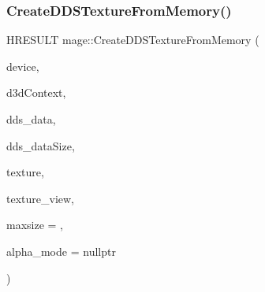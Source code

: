 \subsubsection{\texorpdfstring{Create\+D\+D\+S\+Texture\+From\+Memory()}{CreateDDSTextureFromMemory()}\hspace{0.1cm}{\footnotesize\ttfamily [2/4]}}
{\footnotesize\ttfamily H\+R\+E\+S\+U\+LT mage\+::\+Create\+D\+D\+S\+Texture\+From\+Memory (\begin{DoxyParamCaption}\item[{\+\_\+\+In\+\_\+ \hyperlink{namespacemage_ae74f374780900893caa5555d1031fd79}{Com\+Ptr}$<$ I\+D3\+D11\+Device2 $>$}]{device,  }\item[{\+\_\+\+In\+\_\+opt\+\_\+ I\+D3\+D11\+Device\+Context $\ast$}]{d3d\+Context,  }\item[{\+\_\+\+In\+\_\+reads\+\_\+bytes\+\_\+(dds\+\_\+data\+Size) const uint8\+\_\+t $\ast$}]{dds\+\_\+data,  }\item[{\+\_\+\+In\+\_\+ size\+\_\+t}]{dds\+\_\+data\+Size,  }\item[{\+\_\+\+Outptr\+\_\+opt\+\_\+ I\+D3\+D11\+Resource $\ast$$\ast$}]{texture,  }\item[{\+\_\+\+Outptr\+\_\+opt\+\_\+ I\+D3\+D11\+Shader\+Resource\+View $\ast$$\ast$}]{texture\+\_\+view,  }\item[{\+\_\+\+In\+\_\+ size\+\_\+t}]{maxsize = {},  }\item[{\+\_\+\+Out\+\_\+opt\+\_\+ \hyperlink{namespacemage_a0c586a2bad862f4858900ca121ca80c2}{D\+D\+S\+\_\+\+A\+L\+P\+H\+A\+\_\+\+M\+O\+DE} $\ast$}]{alpha\+\_\+mode = {\ttfamily nullptr} }\end{DoxyParamCaption})}

\hypertarget{namespacemage_a2376afff5e5ebcfae1d9af4132bf343e}{}\label{namespacemage_a2376afff5e5ebcfae1d9af4132bf343e} 
